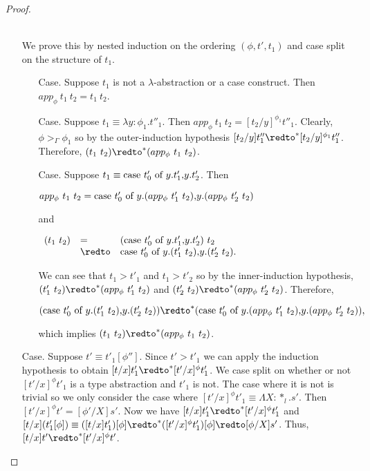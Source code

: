 \begin{proof}
\begin{itemize}
  \ \\
  We prove this by nested induction on the ordering $(\phi, t', t_1)$ and case split on the
  structure of $t_1$.  
  \begin{itemize}
  \item[Case.] Suppose $t_1$ is not a $\lambda$-abstraction or a case construct.  Then 
    $app_\phi\ t_1\ t_2 = t_1\ t_2$.
    
  \item[Case.] Suppose $t_1 \equiv \lambda y:\phi_1.t''_1$.  Then $app_\phi\ t_1\  t_2 = [t_2/y]^{\phi_1} t''_1$.
    Clearly, $\phi >_\Gamma \phi_1$ so by the outer-induction hypothesis 
    $[t_2/y]t''_1 \redto^* [t_2/y]^{\phi_1} t''_1$.  Therefore, $(t_1\ t_2) \redto^* (app_\phi\ t_1\ t_2)$.
    
  \item[Case.] Suppose $t_1 \equiv \mbox{case}\ t'_0\ \text{of}\ y\text{.}t'_1\text{,}y\text{.}t'_2$.  Then 
    \begin{center}
      \begin{math}
        app_\phi\ t_1\ t_2 = \mbox{case}\ t'_0\ \text{of}\ y\text{.}(app_\phi\ t'_1\ t_2)\text{,}y\text{.}(app_\phi\ t'_2\ t_2)
      \end{math}
    \end{center}
    and
    \begin{center}
      \begin{math}
        \begin{array}{lll}
          (t_1\ t_2) & =      & (\ccon{t'_0}{y}{t'_1}{t'_2})\ t_2\\
          & \redto & \ccon{t'_0}{y}{(t'_1\ t_2)}{(t'_2\ t_2)}.
        \end{array}
      \end{math}
    \end{center}
    We can see that $t_1 > t'_1$ and $t_1 > t'_2$ so by the inner-induction hypothesis, $(t'_1\ t_2) \redto^* (app_\phi\ t'_1\ t_2)$ and
    $(t'_2\ t_2) \redto^* (app_\phi\ t'_2\ t_2)$.  Therefore, 
    \begin{center}
      \begin{math}
        (\ccon{t'_0}{y}{(t'_1\ t_2)}{(t'_2\ t_2)}) \redto^* (\ccon{t'_0}{y}{(app_\phi\ t'_1\ t_2)}{(app_\phi\ t'_2\ t_2)}),
      \end{math}
    \end{center}
    which implies $(t_1\ t_2) \redto^* (app_\phi\ t_1\ t_2)$.
  \end{itemize}
  
\item[Case.] Suppose $t' \equiv t'_1[\phi'']$.
  Since $t' > t'_1$ we can apply the induction hypothesis to
  obtain $[t/x] t'_1 \redto^* [t'/x]^\phi t'_1$.  We case split on whether or not $[t'/x]^\phi t'_1$ is
  a type abstraction and $t'_1$ is not.  The case where it is not is trivial so we only consider
  the case where $ [t'/x]^\phi t'_1 \equiv \Lambda X:*_l.s'$.  Then 
  $[t'/x]^\phi t'  = [\phi'/X]s'$.  Now we have $[t/x] t'_1 \redto^* [t'/x]^\phi t'_1$ and
  $[t/x](t'_1[\phi]) \equiv ([t/x]t'_1)[\phi] \redto^* ([t'/x]^\phi t'_1)[\phi] \redto [\phi/X]s'$.  Thus,
  $[t/x]t' \redto^* [t'/x]^\phi t'$.  
\end{itemize}
\end{proof}
